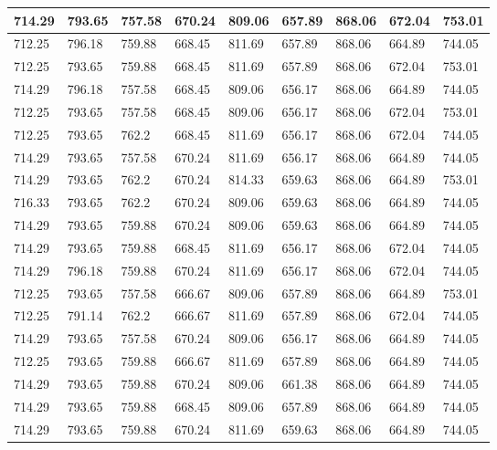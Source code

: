 \begin{longtable}{|l|l|l|l|l|l|l|l|l|}
		714.29   & 793.65  & 757.58  & 670.24  & 809.06 & 657.89  & 868.06   & 672.04  & 753.01  \\ \hline
		712.25   & 796.18  & 759.88  & 668.45  & 811.69 & 657.89  & 868.06   & 664.89  & 744.05  \\ \hline
		712.25   & 793.65  & 759.88  & 668.45  & 811.69 & 657.89  & 868.06   & 672.04  & 753.01  \\ \hline
		714.29   & 796.18  & 757.58  & 668.45  & 809.06 & 656.17  & 868.06   & 664.89  & 744.05  \\ \hline
		712.25   & 793.65  & 757.58  & 668.45  & 809.06 & 656.17  & 868.06   & 672.04  & 753.01  \\ \hline
		712.25   & 793.65  & 762.2   & 668.45  & 811.69 & 656.17  & 868.06   & 672.04  & 744.05  \\ \hline
		714.29   & 793.65  & 757.58  & 670.24  & 811.69 & 656.17  & 868.06   & 664.89  & 744.05  \\ \hline
		714.29   & 793.65  & 762.2   & 670.24  & 814.33 & 659.63  & 868.06   & 664.89  & 753.01  \\ \hline
		716.33   & 793.65  & 762.2   & 670.24  & 809.06 & 659.63  & 868.06   & 664.89  & 744.05  \\ \hline
		714.29   & 793.65  & 759.88  & 670.24  & 809.06 & 659.63  & 868.06   & 664.89  & 744.05  \\ \hline
		714.29   & 793.65  & 759.88  & 668.45  & 811.69 & 656.17  & 868.06   & 672.04  & 744.05  \\ \hline
		714.29   & 796.18  & 759.88  & 670.24  & 811.69 & 656.17  & 868.06   & 672.04  & 744.05  \\ \hline
		712.25   & 793.65  & 757.58  & 666.67  & 809.06 & 657.89  & 868.06   & 664.89  & 753.01  \\ \hline
		712.25   & 791.14  & 762.2   & 666.67  & 811.69 & 657.89  & 868.06   & 672.04  & 744.05  \\ \hline
		714.29   & 793.65  & 757.58  & 670.24  & 809.06 & 656.17  & 868.06   & 664.89  & 744.05  \\ \hline
		712.25   & 793.65  & 759.88  & 666.67  & 811.69 & 657.89  & 868.06   & 664.89  & 744.05  \\ \hline
		714.29   & 793.65  & 759.88  & 670.24  & 809.06 & 661.38  & 868.06   & 664.89  & 744.05  \\ \hline
		714.29   & 793.65  & 759.88  & 668.45  & 809.06 & 657.89  & 868.06   & 664.89  & 744.05  \\ \hline
		714.29   & 793.65  & 759.88  & 670.24  & 811.69 & 659.63  & 868.06   & 664.89  & 744.05  \\ \hline

\end{longtable}
